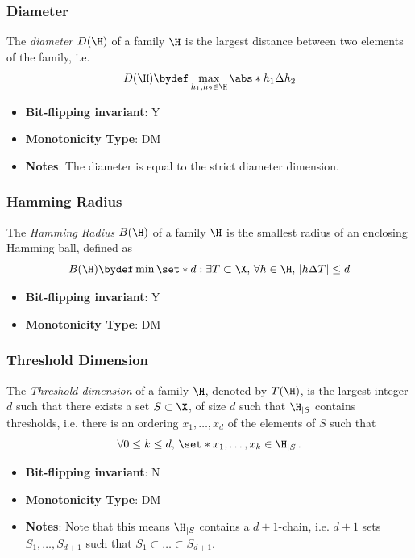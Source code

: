 \subsubsection{Diameter}
      
      \begin{definition}\label{def:diameter}
      The {\em diameter} $D(\H)$ of a family $\H$ is the largest distance between two elements of the family, i.e. \[ D(\H)\bydef \max_{h_1,h_2\in\H} \abs*{h_1\Delta h_2} \]
      \end{definition}
      \begin{itemize}
      \item {\bf Bit-flipping invariant}: Y
      \item {\bf Monotonicity Type}: DM
      \item {\bf Notes}: The diameter is equal to the strict diameter dimension.
\end{itemize}
\subsubsection{Hamming Radius}
      
      \begin{definition}\label{def:hamming_radius}
      The {\em Hamming Radius} $B(\H)$ of a family $\H$ is the smallest radius of an enclosing Hamming ball, defined as \[ B(\H)\bydef \min\set*{d: \exists T\subset \X,\, \forall h\in \H,\, |h\Delta T|\le d} \]
      \end{definition}
      \begin{itemize}
      \item {\bf Bit-flipping invariant}: Y
      \item {\bf Monotonicity Type}: DM
      \end{itemize}
\subsubsection{Threshold Dimension}
      
      \begin{definition}\label{def:threshold_dimension}
      The {\em Threshold dimension} of a family $\H$, denoted by $T(\H)$, is the largest integer $d$ such that there exists a set $S\subset \X$, of size $d$ such that $\H_{|S}$ contains thresholds, i.e. there is an ordering $x_1,\ldots,x_d$ of the elements of $S$ such that \[ \forall 0\le k\le d,\, \set*{x_1,\ldots,x_k} \in \H_{|S}\,. \]
      \end{definition}
      \begin{itemize}
      \item {\bf Bit-flipping invariant}: N
      \item {\bf Monotonicity Type}: DM
      \item {\bf Notes}: Note that this means $\H_{|S}$ contains a $d+1$-chain, i.e. $d+1$ sets $S_1,\ldots,S_{d+1}$ such that $S_1\subset \ldots\subset S_{d+1}$.
\end{itemize}
